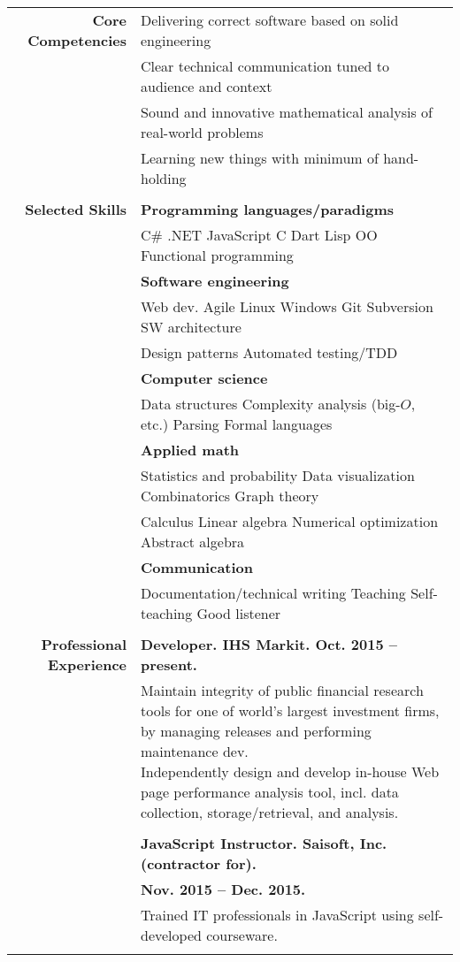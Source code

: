 \documentclass{article}
\newcommand\spc{\hspace{8pt}}
\begin{document}
\bgroup
\begin{tabular}{rl}
  \def\arraystrech{1.5}
  {\bf Core Competencies} & Delivering correct software based on solid engineering \\
   & Clear technical communication tuned to audience and context \\
  & Sound and innovative mathematical analysis of real-world problems \\
  & Learning new things with minimum of hand-holding \\ \\

  {\bf Selected Skills}  & {\bf Programming languages/paradigms} \\
  & C\# \spc .NET \spc JavaScript \spc C \spc Dart \spc Lisp \spc OO \spc Functional programming \\
  & {\bf Software engineering} \\
  & Web dev. \spc Agile \spc Linux \spc Windows \spc Git \spc Subversion \spc SW architecture \\
 & Design patterns \spc Automated testing/TDD \\
    & {\bf Computer science} \\
  & Data structures \spc Complexity analysis (big-$O$, etc.) \spc Parsing \spc Formal languages \\
  & {\bf Applied math} \\
  & Statistics and probability \spc Data visualization \spc Combinatorics \spc Graph theory \\
  & Calculus \spc Linear algebra \spc Numerical optimization \spc Abstract algebra \\
  & {\bf Communication} \\
  & Documentation/technical writing \spc Teaching \spc Self-teaching \spc Good listener \\ \\

  {\bf Professional Experience} & {\bf Developer. IHS Markit. Oct. 2015 -- present.} \\
  & \parbox{4.5in}{Maintain integrity of public financial research tools for one of world's largest investment firms, by managing releases and performing maintenance dev. \\ Independently design and develop in-house Web page performance analysis tool, incl. data collection, storage/retrieval, and analysis.} \\ \\

  & {\bf JavaScript Instructor. Saisoft, Inc. (contractor for).} \\ & {\bf Nov. 2015 -- Dec. 2015.} \\
  & \parbox{4.5in}{Trained IT professionals in JavaScript using self-developed courseware.} \\ \\


\end{tabular}
\end{document}
